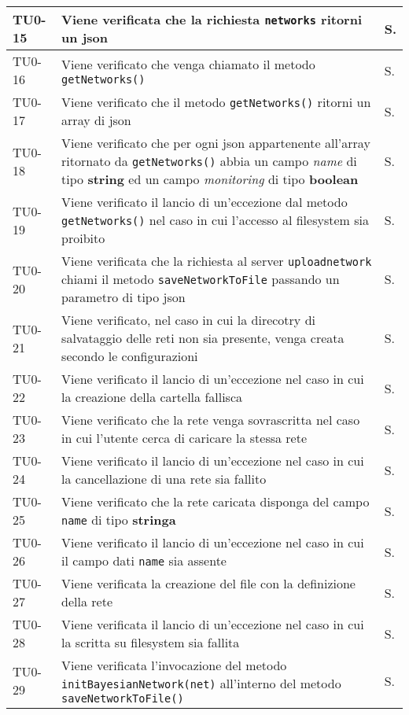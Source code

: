 \begin{longtable}{|C{.15\textwidth}|m{.65\textwidth}|C{.20\textwidth}|}
\hline 
{}TU0-15 & Viene verificata che la richiesta \texttt{networks} ritorni un json & S. \\ 
\hline 
 TU0-16 & Viene verificato che venga chiamato il metodo \texttt{getNetworks()} & S. \\
\hline 
{}TU0-17 & Viene verificato che il metodo \texttt{getNetworks()} ritorni un array di json & S. \\ 
\hline
TU0-18 & Viene verificato che per ogni json appartenente all'array ritornato da \texttt{getNetworks()} abbia un campo \textit{name} di tipo \textbf{string} ed un campo \textit{monitoring} di tipo \textbf{boolean} & S. \\ 
\hline
{}TU0-19 & Viene verificato il lancio di un'eccezione dal metodo \texttt{getNetworks()} nel caso in cui l'accesso al filesystem sia proibito & S. \\ 
\hline 
TU0-20 & Viene verificata che la richiesta al server \texttt{uploadnetwork} chiami il metodo \texttt{saveNetworkToFile} passando un parametro di tipo json & S. \\ 
\hline 
{}TU0-21 & Viene verificato, nel caso in cui la direcotry di salvataggio delle reti non sia presente, venga creata secondo le configurazioni & S. \\ 
\hline 
 TU0-22 & Viene verificato il lancio di un'eccezione nel caso in cui la creazione della cartella fallisca & S. \\ 
\hline 
{}TU0-23 & Viene verificato che la rete venga sovrascritta nel caso in cui l'utente cerca di caricare la stessa rete & S. \\
\hline
 TU0-24 & Viene verificato il lancio di un'eccezione nel caso in cui la cancellazione di una rete sia fallito & S. \\ 
\hline
{}TU0-25 & Viene verificato che la rete caricata disponga del campo \texttt{name} di tipo \textbf{stringa} & S. \\ 
\hline 
 TU0-26 & Viene verificato il lancio di un'eccezione nel caso in cui il campo dati \texttt{name} sia assente & S. \\ 
\hline 
{}TU0-27	 & Viene verificata la creazione del file con la definizione della rete & S. \\ 
\hline 
 TU0-28 & Viene verificata il lancio di un'eccezione nel caso in cui la scritta su filesystem sia fallita & S. \\ 
\hline 
{}TU0-29 & Viene verificata l'invocazione del metodo \texttt{initBayesianNetwork(net)} all'interno del metodo \texttt{saveNetworkToFile()} & S. \\ 

\end{longtable}
